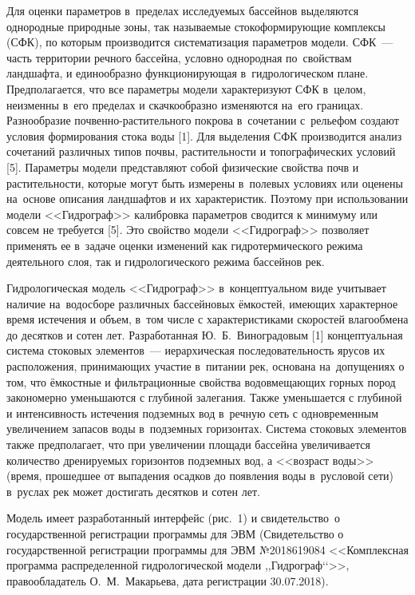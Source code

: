 Для оценки параметров в~пределах исследуемых бассейнов выделяются однородные природные зоны, так называемые стокоформирующие комплексы (СФК), по которым производится систематизация параметров модели. СФК~--- часть территории речного бассейна, условно однородная по~свойствам ландшафта, и единообразно функционирующая в~гидрологическом плане. Предполагается, что все параметры модели характеризуют СФК в~целом, неизменны в~его пределах и скачкообразно изменяются на~его границах. Разнообразие почвенно-растительного покрова в~сочетании с~рельефом создают условия формирования стока воды [1]. Для выделения СФК производится анализ сочетаний различных типов почвы, растительности и топографических условий [5]. Параметры модели представляют собой физические свойства почв и растительности, которые могут быть измерены в~полевых условиях или оценены на~основе описания ландшафтов и их характеристик. Поэтому при использовании модели <<Гидрограф>> калибровка параметров сводится к минимуму или совсем не требуется [5]. Это свойство модели <<Гидрограф>> позволяет применять ее в~задаче оценки изменений как гидротермического режима деятельного слоя, так и гидрологического режима бассейнов рек.




Гидрологическая модель <<Гидрограф>> в~концептуальном виде учитывает наличие на~водосборе различных бассейновых ёмкостей, имеющих характерное время истечения и объем, в~том числе с характеристиками скоростей влагообмена до десятков и сотен лет. Разработанная Ю.~Б.~Виноградовым [1] концептуальная система стоковых элементов~--- иерархическая последовательность ярусов их расположения, принимающих участие в~питании рек, основана на~допущениях о том, что ёмкостные и фильтрационные свойства водовмещающих горных пород закономерно уменьшаются с глубиной залегания. Также уменьшается с глубиной и интенсивность истечения подземных вод в~речную сеть с одновременным увеличением запасов воды в~подземных горизонтах. Система стоковых элементов также предполагает, что при увеличении площади бассейна увеличивается количество дренируемых горизонтов подземных вод, а <<возраст воды>> (время, прошедшее от выпадения осадков до появления воды в~русловой сети) в~руслах рек может достигать десятков и сотен лет.

Модель имеет разработанный интерфейс (рис.~1) и свидетельство о государственной регистрации программы для ЭВМ (Свидетельство о государственной регистрации программы для ЭВМ №2018619084 <<Комплексная программа распределенной гидрологической модели ,,Гидрограф‘‘>>, правообладатель О.~М.~Макарьева, дата регистрации 30.07.2018).

